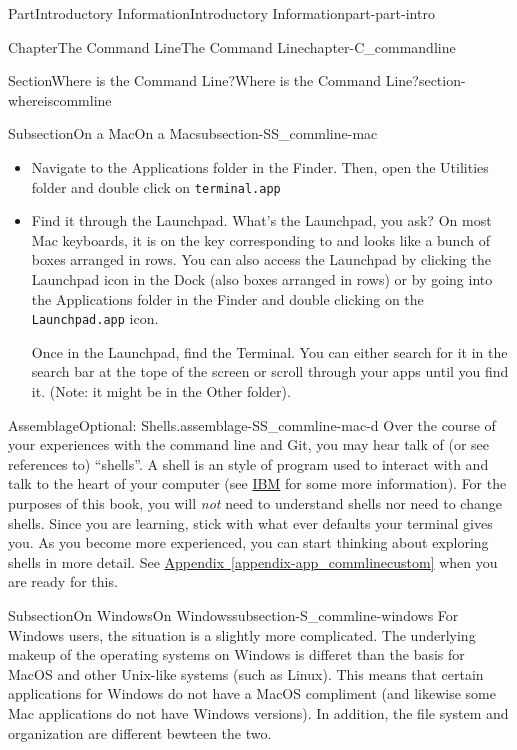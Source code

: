 \documentclass[oneside,10pt,]{book}
\newcommand{\xreffont}{\relax}
\newcommand{\mono}[1]{\texttt{#1}}
\newcommand{\kbd}[1]{\keys{{#1}}}
\begin{document}
\begin{partptx}{Part}{Introductory Information}{}{Introductory Information}{}{}{part-part-intro}
\begin{chapterptx}{Chapter}{The Command Line}{}{The Command Line}{}{}{chapter-C_commandline}
\begin{sectionptx}{Section}{Where is the Command Line?}{}{Where is the Command Line?}{}{}{section-whereiscommline}
\begin{subsectionptx}{Subsection}{On a Mac}{}{On a Mac}{}{}{subsection-SS_commline-mac}
\begin{itemize}[label=\textbullet]
\item{}Navigate to the Applications folder in the Finder. Then, open the Utilities folder and double click on \mono{terminal.app}%
\item{}Find it through the Launchpad. What's the Launchpad, you ask? On most Mac keyboards, it is on the key corresponding to \kbd{F4} and looks like a bunch of boxes arranged in rows. You can also access the Launchpad by clicking the Launchpad icon in the Dock (also boxes arranged in rows) or by going into the Applications folder in the Finder and double clicking on the \mono{Launchpad.app} icon.%
\par
Once in the Launchpad, find the Terminal. You can either search for it in the search bar at the tope of the screen or scroll through your apps until you find it. (Note: it might be in the Other folder).%
\end{itemize}
%
\begin{assemblage}{Assemblage}{Optional: Shells.}{assemblage-SS_commline-mac-d}%
Over the course of your experiences with the command line and Git, you may hear talk of (or see references to) ``shells''. A shell is an style of program used to interact with and talk to the heart of your computer (see \href{https://www.ibm.com/docs/en/aix/7.2?topic=administration-operating-system-shells}{IBM}\footnotemark{} for some more information). For the purposes of this book, you will \emph{not} need to understand shells nor need to change shells. Since you are learning, stick with what ever defaults your terminal gives you. As you become more experienced, you can start thinking about exploring shells in more detail. See \hyperref[appendix-app_commlinecustom]{Appendix~{\xreffont\ref{appendix-app_commlinecustom}}} when you are ready for this.%
\end{assemblage}
%
\end{subsectionptx}
%
%
\typeout{************************************************}
\typeout{************************************************}
%
\begin{subsectionptx}{Subsection}{On Windows}{}{On Windows}{}{}{subsection-S_commline-windows}
%
For Windows users, the situation is a slightly more complicated. The underlying makeup of the operating systems on Windows is differet than the basis for MacOS and other Unix-like systems (such as Linux). This means that certain applications for Windows do not have a MacOS compliment (and likewise some Mac applications do not have Windows versions). In addition, the file system and organization are different bewteen the two.%

\end{subsectionptx}
\end{sectionptx}
\end{chapterptx}
\end{partptx}
\end{document}
